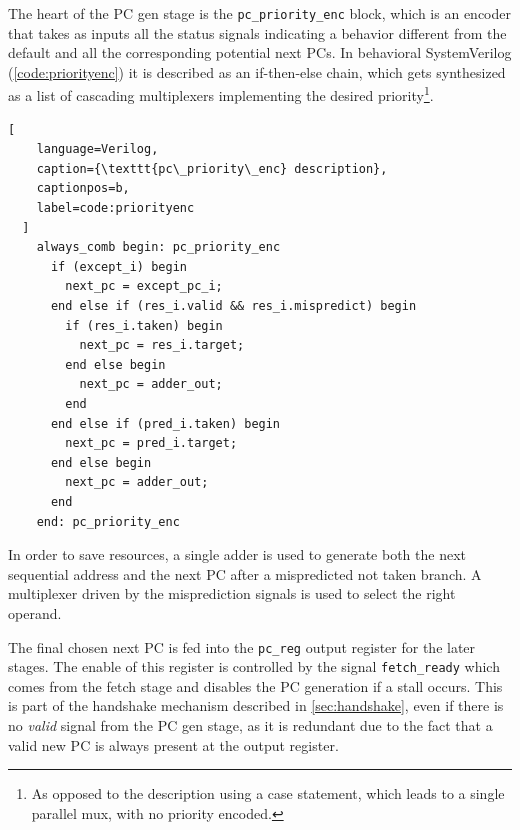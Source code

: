 The heart of the \ac{PC} gen stage is the \texttt{pc\_priority\_enc} block, which is an encoder that takes as inputs all the status signals indicating a behavior different from the default and all the corresponding potential next \acp{PC}. In behavioral SystemVerilog (\cref{code:priorityenc}) it is described as an if-then-else chain, which gets synthesized as a list of cascading multiplexers implementing the desired priority\footnote{As opposed to the description using a case statement, which leads to a single parallel mux, with no priority encoded.}.

\begin{minipage}{\textwidth}
  \begin{lstlisting}[
    language=Verilog,
    caption={\texttt{pc\_priority\_enc} description},
    captionpos=b,
    label=code:priorityenc
  ]
    always_comb begin: pc_priority_enc
      if (except_i) begin
        next_pc = except_pc_i;
      end else if (res_i.valid && res_i.mispredict) begin
        if (res_i.taken) begin
          next_pc = res_i.target;
        end else begin
          next_pc = adder_out;
        end
      end else if (pred_i.taken) begin
        next_pc = pred_i.target;
      end else begin
        next_pc = adder_out;
      end
    end: pc_priority_enc
  \end{lstlisting}
\end{minipage}

In order to save resources, a single adder is used to generate both the next sequential address and the next \ac{PC} after a mispredicted not taken branch. A multiplexer driven by the misprediction signals is used to select the right operand.

The final chosen next \ac{PC} is fed into the \texttt{pc\_reg} output register for the later stages. The enable of this register is controlled by the signal \texttt{fetch\_ready} which comes from the fetch stage and disables the \ac{PC} generation if a stall occurs. This is part of the handshake mechanism described in \cref{sec:handshake}, even if there is no \emph{valid} signal from the \ac{PC} gen stage, as it is redundant due to the fact that a valid new \ac{PC} is always present at the output register.

